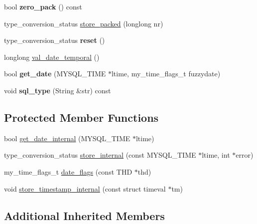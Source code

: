 \begin{DoxyCompactItemize}
\mbox{\label{classField__datetimef_ab30e04c673cf7260392927ccbc9a1753}} 
bool {\bfseries zero\+\_\+pack} () const
\item 
type\+\_\+conversion\+\_\+status \mbox{\hyperlink{classField__datetimef_a16ff3d457851e43787c57916ea614241}{store\+\_\+packed}} (longlong nr)
\item 
\mbox{\label{classField__datetimef_a38d03fd21989d31440267a9b64f9e277}} 
type\+\_\+conversion\+\_\+status {\bfseries reset} ()
\item 
longlong \mbox{\hyperlink{classField__datetimef_aec7455bda53c84017097539ac92c91d2}{val\+\_\+date\+\_\+temporal}} ()
\item 
\mbox{\label{classField__datetimef_a5e3e4ed6f3229348cfa134eef036967e}} 
bool {\bfseries get\+\_\+date} (M\+Y\+S\+Q\+L\+\_\+\+T\+I\+ME $\ast$ltime, my\+\_\+time\+\_\+flags\+\_\+t fuzzydate)
\item 
\mbox{\label{classField__datetimef_acd70c85f574786a5c1c471dafc5cbc9f}} 
void {\bfseries sql\+\_\+type} (String \&str) const
\end{DoxyCompactItemize}
\subsection*{Protected Member Functions}
\begin{DoxyCompactItemize}
\item 
bool \mbox{\hyperlink{classField__datetimef_a54497950174c5034fd1ffd97e08bc368}{get\+\_\+date\+\_\+internal}} (M\+Y\+S\+Q\+L\+\_\+\+T\+I\+ME $\ast$ltime)
\item 
type\+\_\+conversion\+\_\+status \mbox{\hyperlink{classField__datetimef_a15efe08f94a2a01938ceb8b5bed6aa4f}{store\+\_\+internal}} (const M\+Y\+S\+Q\+L\+\_\+\+T\+I\+ME $\ast$ltime, int $\ast$error)
\item 
my\+\_\+time\+\_\+flags\+\_\+t \mbox{\hyperlink{classField__datetimef_a5d243b48967c529a72ac3acb22b5a717}{date\+\_\+flags}} (const T\+HD $\ast$thd)
\item 
void \mbox{\hyperlink{classField__datetimef_adb90beeaafa4b792067cd838084e230f}{store\+\_\+timestamp\+\_\+internal}} (const struct timeval $\ast$tm)
\end{DoxyCompactItemize}
\subsection*{Additional Inherited Members}



